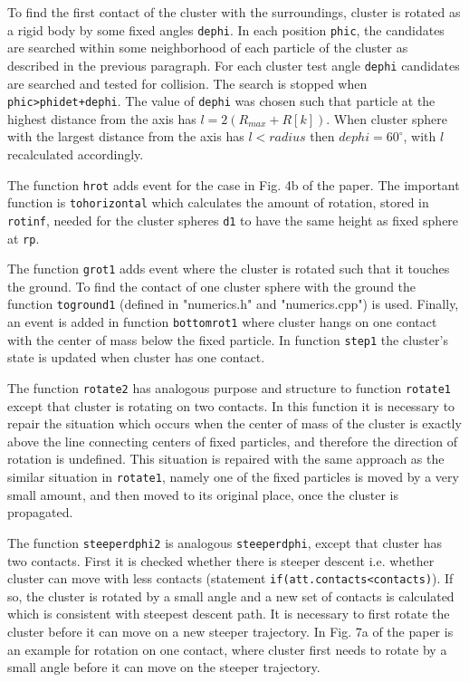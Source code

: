 \documentclass[12pt]{article}
\begin{document}
To find the first contact of the cluster with the surroundings, cluster is rotated as a rigid body by some fixed angles \texttt{dephi}. In each position \texttt{phic}, the candidates are searched within some neighborhood of each particle of the cluster as described in the previous paragraph. For each cluster test angle \texttt{dephi} candidates are searched and tested for collision. The search is stopped when \texttt{phic>phidet+dephi}.  The value of \texttt{dephi} was chosen such that particle at the highest distance from the axis has $l=2(R_{max}+R[k])$. When cluster sphere with the largest distance from the axis has $l<radius$ then $dephi=60^{\circ}$, with $l$ recalculated accordingly. 

The function \texttt{hrot} adds event for the case in Fig. 4b of the paper. The important function is \texttt{tohorizontal} which calculates the amount of rotation, stored in \texttt{rotinf}, needed for the cluster spheres \texttt{d1} to have the same height as fixed sphere at \texttt{rp}.

The function \texttt{grot1} adds event where the cluster is rotated such that it touches the ground. To find the contact of one cluster sphere with the ground the function \texttt{toground1} (defined in "numerics.h" and "numerics.cpp") is used. Finally, an event is added in function \texttt{bottomrot1} where cluster hangs on one contact with the center of mass below the fixed particle. In function \texttt{step1} the cluster's state is updated when cluster has one contact.

The function \texttt{rotate2} has analogous purpose and structure to function \texttt{rotate1} except that cluster is rotating on two contacts. In this function it is necessary to repair the situation which occurs when the center of mass of the cluster is exactly above the line connecting centers of fixed particles, and therefore the direction of rotation is undefined. This situation is repaired with the same approach as the similar situation in \texttt{rotate1}, namely one of the fixed particles is moved by a very small amount, and then moved to its original place, once the cluster is propagated.

The function \texttt{steeperdphi2} is analogous \texttt{steeperdphi}, except that cluster has two contacts. First it is checked whether there is steeper descent i.e. whether cluster can move with less contacts (statement \texttt{if(att.contacts<contacts)}). If so, the cluster is rotated by a small angle and a new set of contacts is calculated which is consistent with steepest descent path. It is necessary to first rotate the cluster before it can move on a new steeper trajectory. In Fig. 7a of the paper is an example for rotation on one contact, where cluster first needs to rotate by a small angle before it can move on the steeper trajectory.
\end{document}
